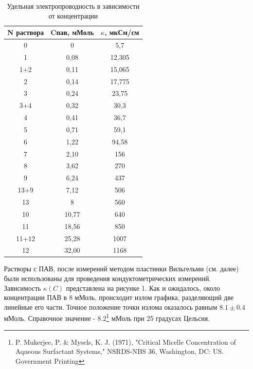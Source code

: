 \documentclass[a4paper, 12pt]{article}
\begin{document}
\begin{table}[h]
\begin{center}
\caption{Удельная электропроводность в зависимости от концентрации}
\begin{tabular}{|c|c|c|}
\hline
N раствора     & Cпав, мМоль  & $\kappa$, мкСм/см \\ \hline
0     & 0     & 5,7        \\ \hline
1     & 0,08  & 12,305     \\ \hline
1+2   & 0,11  & 15,065     \\ \hline
2     & 0,14  & 17,775     \\ \hline
3     & 0,24  & 23,75      \\ \hline
3+4   & 0,32  & 30,3       \\ \hline
4     & 0,41  & 36,7       \\ \hline
5     & 0,71  & 59,1       \\ \hline
6     & 1,22  & 94,58      \\ \hline
7     & 2,10  & 156        \\ \hline
8     & 3,62  & 270        \\ \hline
9     & 6,24  & 437        \\ \hline
13+9  & 7,12  & 506        \\ \hline
13    & 8     & 560        \\ \hline
10    & 10,77 & 640        \\ \hline
11    & 18,56 & 850        \\ \hline
11+12 & 25,28 & 1007       \\ \hline
12    & 32,00 & 1168       \\ \hline
\end{tabular}
\end{center}
\end{table}

Растворы с ПАВ, после измерений методом пластинки Вильгельми (см. далее) были использованы для проведения кондуктометрических измерений. Зависимость $\kappa(C)$ представлена на рисунке 1. Как и ожидалось, около концентрации ПАВ в 8 мМоль, происходит излом графика, разделяющий две линейные его части. Точное положение точки излома оказалось равным $8.1 \pm 0.4$ мМоль. Справочное значение - 8.2\footnote{P. Mukerjee, P. & Mysels, K. J. (1971), "Critical Micelle Concentration of Aqueous Surfactant Systems," NSRDS-NBS 36, Washington, DC: US. Government Printing} мМоль при 25 градусах Цельсия.
\end{document}
